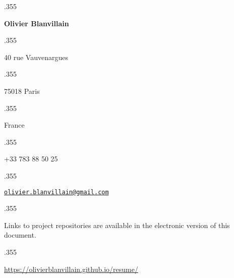 \documentclass[margin, a4paper]{res}
\let\link\href
\renewcommand{\href}[2]{\link{#1}{\scriptsize{\faExternalLink}}}
\newcommand{\centered}[1]{\moveleft.355\hoffset\centerline{#1}}
\begin{document}
\centered{\LARGE\textbf{Olivier Blanvillain}}
\vspace{3pt}
\centered{40 rue Vauvenargues}
\centered{75018 Paris}
\centered{France}
\vspace{3pt}
\centered{+33 783 88 50 25}
\centered{\link{mailto:olivier.blanvillain@gmail.com}{\texttt{olivier.blanvillain@gmail.com}}}

\begin{resume}
  
\end{resume}

\vspace{25pt}

\centered{\footnotesize Links to project repositories are available in the electronic version of this document.}
\centered{\footnotesize\url{https://olivierblanvillain.github.io/resume/}}
\end{document}
